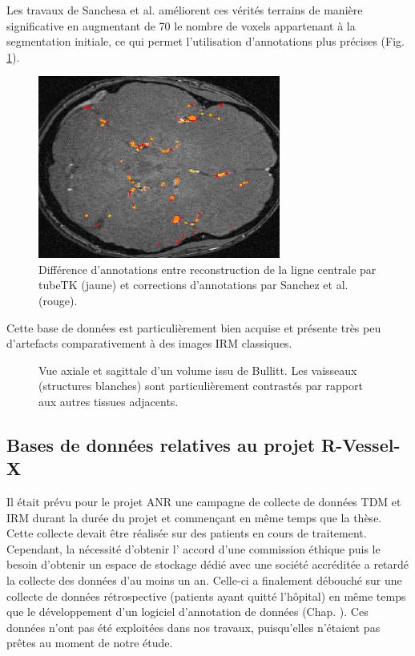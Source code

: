 Les travaux de Sanchesa et al. \cite{Sanchez2019_annotations_deep} améliorent ces vérités terrains de manière significative en augmentant de 70 \percent{} le nombre de voxels appartenant à la segmentation initiale, ce qui permet l'utilisation d'annotations plus précises (Fig.  \ref{fig:Bullitt_annotation_ameliorations}).
\begin{figure}
    \centering
    \includegraphics[height=6cm]{Images/Bullitt_annotation_ameliorations.png}
    \caption{Différence d'annotations entre reconstruction de la ligne centrale par tubeTK (jaune) et corrections d'annotations par Sanchez et al. (rouge). }
    \label{fig:Bullitt_annotation_ameliorations}
\end{figure}
Cette base de données est particulièrement bien acquise et présente très peu d'artefacts comparativement à des images IRM classiques. 
\begin{figure}
    \centering
    \caption{Vue axiale et sagittale d'un volume issu de Bullitt. Les vaisseaux (structures blanches) sont particulièrement contrastés par rapport aux autres tissues adjacents.}
    \label{fig:Bullitt_example}
\end{figure}
\subsection{Bases de données relatives au projet R-Vessel-X}
Il était prévu pour le projet ANR une campagne de collecte de données TDM et IRM durant la durée du projet et commençant en même temps que la thèse. Cette collecte devait être réalisée sur des patients en cours de traitement. Cependant, la nécessité d'obtenir l' accord d'une commission éthique puis le besoin d'obtenir un espace de stockage dédié avec une société accréditée a retardé la collecte des données d'au moins un an. Celle-ci a finalement débouché sur une collecte de données rétrospective (patients ayant quitté l'hôpital) en même temps que le développement d'un logiciel d'annotation de données (Chap. \chapReproN{}). Ces données n'ont pas été exploitées dans nos travaux, puisqu’elles n’étaient pas prêtes au moment de notre étude.
